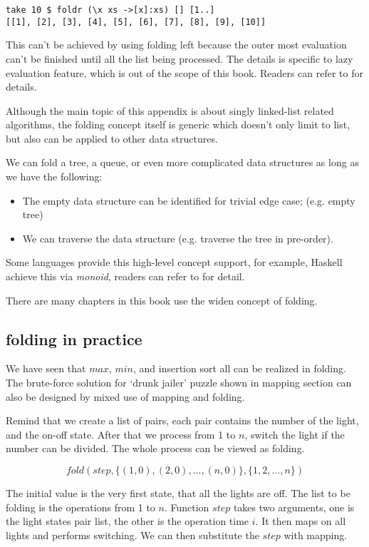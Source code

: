 \documentclass[UTF8]{article}
\begin{document}
\lstset{language=Haskell}
\begin{lstlisting}
take 10 $ foldr (\x xs ->[x]:xs) [] [1..]
[[1], [2], [3], [4], [5], [6], [7], [8], [9], [10]]
\end{lstlisting} %

This can't be achieved by using folding left because the outer most evaluation can't be finished until
all the list being processed. The details is specific to lazy evaluation feature, which is out of the
scope of this book. Readers can refer to \cite{Haskell-wiki} for details.

Although the main topic of this appendix is about singly linked-list related algorithms, the folding
concept itself is generic which doesn't only limit to list, but also can be applied to other data structures.

We can fold a tree, a queue, or even more complicated data structures as long as we have the following:

\begin{itemize}
\item The empty data structure can be identified for trivial edge case; (e.g. empty tree)
\item We can traverse the data structure (e.g. traverse the tree in pre-order).
\end{itemize}

Some languages provide this high-level concept support, for example, Haskell achieve this via
{\em monoid}, readers can refer to \cite{learn-haskell} for detail.

There are many chapters in this book use the widen concept of folding.

\subsection{folding in practice}

We have seen that $max$, $min$, and insertion sort all can be realized in folding. The
brute-force solution for `drunk jailer' puzzle shown in mapping section can also be
designed by mixed use of mapping and folding.

Remind that we create a list of pairs, each pair contains the number of the light, and
the on-off state. After that we process from 1 to $n$, switch the light if the number
can be divided. The whole process can be viewed as folding.

\[
fold(step, \{(1, 0), (2, 0), ..., (n, 0) \}, \{1, 2, ..., n\})
\]

The initial value is the very first state, that all the lights are off. The list to be
folding is the operations from 1 to $n$. Function $step$ takes two arguments, one is
the light states pair list, the other is the operation time $i$. It then maps
on all lights and performs switching. We can then substitute the $step$ with mapping.
\end{document}
